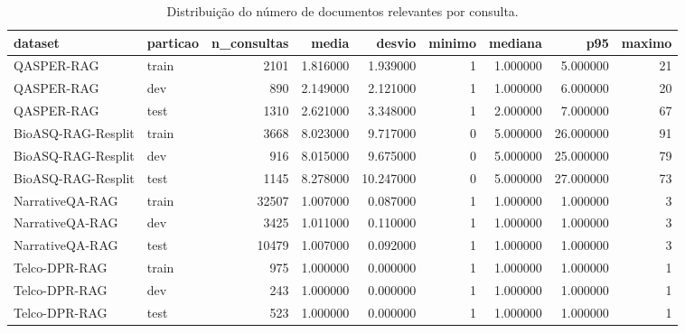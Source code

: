 \begin{table}
\caption{Distribuição do número de documentos relevantes por consulta.}
\label{tab:tabela_relevants_por_consulta}
\begin{tabular}{llrrrrrrr}
\toprule
dataset & particao & n\_consultas & media & desvio & minimo & mediana & p95 & maximo \\
\midrule
QASPER-RAG & train & 2101 & 1.816000 & 1.939000 & 1 & 1.000000 & 5.000000 & 21 \\
QASPER-RAG & dev & 890 & 2.149000 & 2.121000 & 1 & 1.000000 & 6.000000 & 20 \\
QASPER-RAG & test & 1310 & 2.621000 & 3.348000 & 1 & 2.000000 & 7.000000 & 67 \\
BioASQ-RAG-Resplit & train & 3668 & 8.023000 & 9.717000 & 0 & 5.000000 & 26.000000 & 91 \\
BioASQ-RAG-Resplit & dev & 916 & 8.015000 & 9.675000 & 0 & 5.000000 & 25.000000 & 79 \\
BioASQ-RAG-Resplit & test & 1145 & 8.278000 & 10.247000 & 0 & 5.000000 & 27.000000 & 73 \\
NarrativeQA-RAG & train & 32507 & 1.007000 & 0.087000 & 1 & 1.000000 & 1.000000 & 3 \\
NarrativeQA-RAG & dev & 3425 & 1.011000 & 0.110000 & 1 & 1.000000 & 1.000000 & 3 \\
NarrativeQA-RAG & test & 10479 & 1.007000 & 0.092000 & 1 & 1.000000 & 1.000000 & 3 \\
Telco-DPR-RAG & train & 975 & 1.000000 & 0.000000 & 1 & 1.000000 & 1.000000 & 1 \\
Telco-DPR-RAG & dev & 243 & 1.000000 & 0.000000 & 1 & 1.000000 & 1.000000 & 1 \\
Telco-DPR-RAG & test & 523 & 1.000000 & 0.000000 & 1 & 1.000000 & 1.000000 & 1 \\
\bottomrule
\end{tabular}
\end{table}
